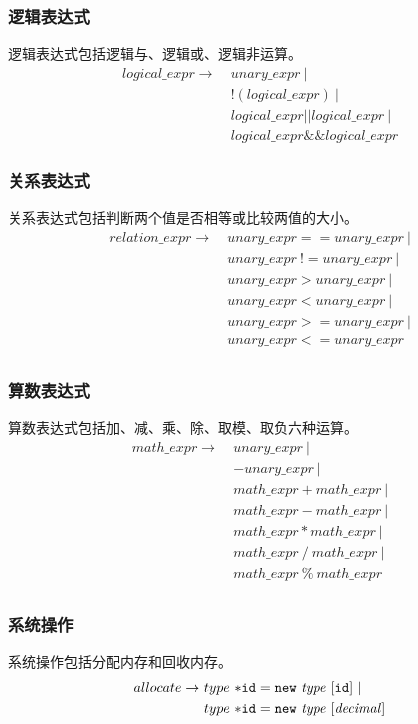 \documentclass[UTF8,a4paper,10pt]{ctexart}
\begin{document}
\subsubsection{逻辑表达式}
逻辑表达式包括逻辑与、逻辑或、逻辑非运算。
\begin{align*}
logical\_expr \rightarrow\ &unary\_expr\ |\\
&!(logical\_expr)\ |\\
&logical\_expr || logical\_expr\ |\\
&logical\_expr \&\& logical\_expr
\end{align*}
\subsubsection{关系表达式}
关系表达式包括判断两个值是否相等或比较两值的大小。
\begin{align*}
relation\_expr \rightarrow \ &unary\_expr==unary\_expr\ |\\
&unary\_expr\ != unary\_expr\ |\\
&unary\_expr > unary\_expr\ |\\
&unary\_expr < unary\_expr\ |\\
&unary\_expr >= unary\_expr\ |\\
&unary\_expr <= unary\_expr\\
\end{align*}
\subsubsection{算数表达式}
算数表达式包括加、减、乘、除、取模、取负六种运算。
\begin{align*}
math\_expr \rightarrow \ &unary\_expr\ |\\
&-unary\_expr\ |\\
&math\_expr + math\_expr\ |\\
&math\_expr - math\_expr\ |\\
&math\_expr * math\_expr\ |\\
&math\_expr\ / \ math\_expr\ |\\
&math\_expr\ \% \ math\_expr\\
\end{align*}
\subsubsection{系统操作}
系统操作包括分配内存和回收内存。
\begin{align*}
allocate \rightarrow \ &type\ \tt{*id} = \text{$\tt{new} $}\ \it{type}\ [\text{$\tt{id}$}]\ |\\
&type\ \tt{*id} =  \tt{new}\ \it{type}\ [decimal]
\end{align*}
\end{document}
